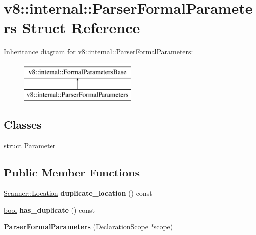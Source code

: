 \hypertarget{structv8_1_1internal_1_1ParserFormalParameters}{}\section{v8\+:\+:internal\+:\+:Parser\+Formal\+Parameters Struct Reference}
\label{structv8_1_1internal_1_1ParserFormalParameters}
Inheritance diagram for v8\+:\+:internal\+:\+:Parser\+Formal\+Parameters\+:\begin{figure}[H]
\begin{center}
\leavevmode
\includegraphics[height=2.000000cm]{structv8_1_1internal_1_1ParserFormalParameters}
\end{center}
\end{figure}
\subsection*{Classes}
\begin{DoxyCompactItemize}
\item 
struct \mbox{\hyperlink{structv8_1_1internal_1_1ParserFormalParameters_1_1Parameter}{Parameter}}
\end{DoxyCompactItemize}
\subsection*{Public Member Functions}
\begin{DoxyCompactItemize}
\item 
\mbox{\label{structv8_1_1internal_1_1ParserFormalParameters_a2464a9a588cef21bf36a2962711f91b8}} 
\mbox{\hyperlink{structv8_1_1internal_1_1Scanner_1_1Location}{Scanner\+::\+Location}} {\bfseries duplicate\+\_\+location} () const
\item 
\mbox{\label{structv8_1_1internal_1_1ParserFormalParameters_af98f48560997733a981642abda00ae0e}} 
\mbox{\hyperlink{classbool}{bool}} {\bfseries has\+\_\+duplicate} () const
\item 
\mbox{\label{structv8_1_1internal_1_1ParserFormalParameters_a5d62da1797a22e1bd426937bb70f4390}} 
{\bfseries Parser\+Formal\+Parameters} (\mbox{\hyperlink{classv8_1_1internal_1_1DeclarationScope}{Declaration\+Scope}} $\ast$scope)
\end{DoxyCompactItemize}
